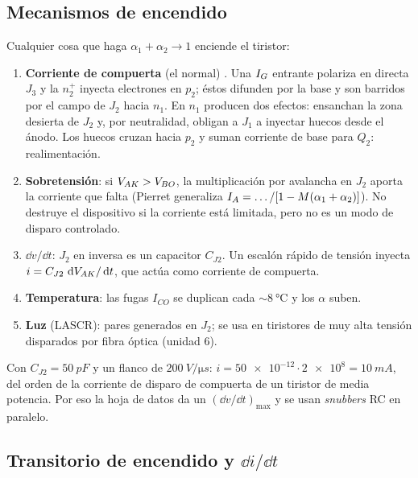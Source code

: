 \subsection{Mecanismos de encendido}

Cualquier cosa que haga $\alpha_1+\alpha_2\to1$ enciende el tiristor:
\begin{enumerate}
  \item \textbf{Corriente de compuerta} (el normal) . Una $I_{G}$ entrante polariza en
  directa $J_3$ y la $n_2^+$ inyecta electrones en $p_2$; éstos difunden por la base y son barridos
  por el campo de $J_2$ hacia $n_1$. En $n_1$ producen dos efectos: ensanchan la zona desierta de
  $J_2$ y, por neutralidad, obligan a $J_1$ a inyectar huecos desde el ánodo. Los huecos cruzan hacia
  $p_2$ y suman corriente de base para $Q_2$: realimentación.
  \item \textbf{Sobretensión}: si $V_{AK}>V_{BO}$, la multiplicación por avalancha en $J_2$ aporta la
  corriente que falta (Pierret generaliza $I_{A}=\dots/[1-M(\alpha_1+\alpha_2)]$). No destruye el
  dispositivo si la corriente está limitada, pero no es un modo de disparo controlado.
  \item \textbf{$\dd v/\dd t$}: $J_2$ en inversa es un capacitor $C_{J2}$. Un escalón rápido de tensión
  inyecta $i=C_{J2}\,\,\mathrm{d}V_{AK}/\,\mathrm{d} t$, que actúa como corriente de compuerta.
  \item \textbf{Temperatura}: las fugas $I_{CO}$ se duplican cada $\sim\SI{8}{\celsius}$ y los $\alpha$
  suben.
  \item \textbf{Luz} (LASCR): pares generados en $J_2$; se usa en tiristores de muy alta tensión
  disparados por fibra óptica (unidad 6).
\end{enumerate}

\begin{ejemplo}
Con $C_{J2}=\SI{50}{pF}$ y un flanco de $\SI{200}{V/\micro s}$:
$i=\num{50e-12}\cdot\num{2e8}=\SI{10}{mA}$, del orden de la corriente de disparo de compuerta de un
tiristor de media potencia. Por eso la hoja de datos da un $(\dd v/\dd t)_{\max}$ y se usan
\emph{snubbers} RC en paralelo.
\end{ejemplo}

\subsection{Transitorio de encendido y $\dd i/\dd t$}

